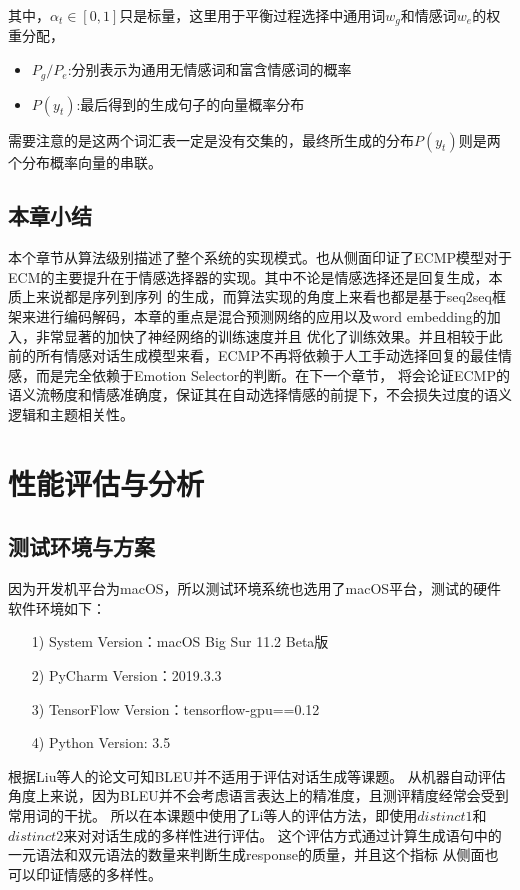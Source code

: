 \documentclass[supercite]{HustGraduPaper}
\theoremstyle{definition}
\begin{document}
其中，$\alpha_t \in [0,1]$只是标量，这里用于平衡过程选择中通用词$w_g$和情感词$w_e$的权重分配，
\begin{itemize}
  \item $P_g/P_e$:分别表示为通用无情感词和富含情感词的概率
  \item $P(y_t)$:最后得到的生成句子的向量概率分布
\end{itemize}
需要注意的是这两个词汇表一定是没有交集的，最终所生成的分布$P(y_t)$则是两个分布概率向量的串联。

\subsection{本章小结}
本个章节从算法级别描述了整个系统的实现模式。也从侧面印证了ECMP模型对于ECM\cite{DBLP:journals/corr/ZhouHZZL17}的主要提升在于情感选择器的实现。其中不论是情感选择还是回复生成，本质上来说都是序列到序列
的生成，而算法实现的角度上来看也都是基于seq2seq框架来进行编码解码，本章的重点是混合预测网络的应用以及word embedding的加入，非常显著的加快了神经网络的训练速度并且
优化了训练效果。并且相较于此前的所有情感对话生成模型来看，ECMP不再将依赖于人工手动选择回复的最佳情感，而是完全依赖于Emotion Selector的判断。在下一个章节，
将会论证ECMP的语义流畅度和情感准确度，保证其在自动选择情感的前提下，不会损失过度的语义逻辑和主题相关性。

\section{性能评估与分析}
\subsection{测试环境与方案}
因为开发机平台为macOS，所以测试环境系统也选用了macOS平台，测试的硬件软件环境如下：
\begin{itemize}
  \item [1)]System Version：macOS Big Sur 11.2 Beta版
  \item [2)]PyCharm Version：2019.3.3
  \item [3)]TensorFlow Version：tensorflow-gpu==0.12
  \item [4)]Python Version: 3.5
\end{itemize}

根据Liu\cite{liu-etal-2016-evaluate}等人的论文可知BLEU并不适用于评估对话生成等课题。
从机器自动评估角度上来说，因为BLEU并不会考虑语言表达上的精准度，且测评精度经常会受到常用词的干扰。
所以在本课题中使用了Li\cite{li2015diversity}等人的评估方法，即使用$distinct 1$和$distinct 2$来对对话生成的多样性进行评估。
这个评估方式通过计算生成语句中的一元语法和双元语法的数量来判断生成response的质量，并且这个指标
从侧面也可以印证情感的多样性。
\end{document}
